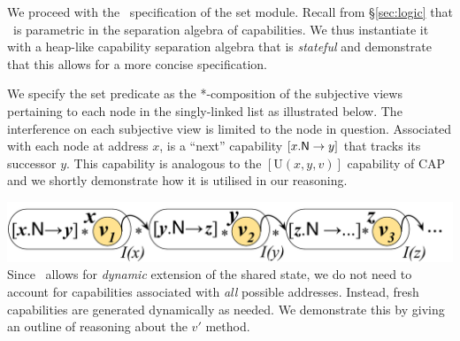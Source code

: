 %
We proceed with the \colosl\ specification of the set module. Recall from \S\ref{sec:logic} that \colosl\ is parametric in the separation algebra of capabilities. We thus instantiate it with a heap-like capability separation algebra that is \emph{stateful} and demonstrate that this allows for a more concise specification.  

We specify the set predicate as the *-composition of the subjective views pertaining to each node in the singly-linked list as illustrated below. The interference on each subjective view is limited to the node in question. Associated with each node at address $x$, is a ``next'' capability $\nextC{x}{y}$ that tracks its successor $y$. This capability is analogous to the $[\text{U}(x, y, v)]$ capability of CAP and we shortly demonstrate how it is utilised in our reasoning.

%
{\centering \includegraphics[scale=0.24]{Sections/FurtherExamples/Images/coloslSet.pdf}\\}
%
\noindent Since \colosl\ allows for \emph{dynamic} extension of the shared state, we do not need to account for capabilities associated with \emph{all} possible addresses. Instead, fresh capabilities are generated dynamically as needed. We demonstrate this by giving an outline of reasoning about the $v'$\li{)} method. 

